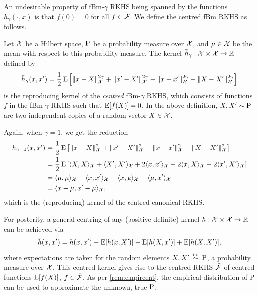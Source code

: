 An undesirable property of fBm-$\gamma$ RKHS being spanned by the functions $h_\gamma(\cdot,x)$ is that $f(0)=0$ for all $f \in {\mathcal F}$.
We define the centred fBm RKHS as follows.

\begin{definition}
  Let ${\mathcal X}$ be a Hilbert space, $\operatorname{P}$ be a probability measure over ${\mathcal X}$, and $\mu\in{\mathcal X}$ be the mean 
  with respect to this probability measure.
  The kernel $\bar h_\gamma:{\mathcal X}\times{\mathcal X}\to\mathbb{R}$ defined by
  \[
    \bar h_\gamma(x,x') = \frac{1}{2} \operatorname{E} \left[ \lVert x-X\rVert_{\mathcal X}^{2\gamma} + \lVert x'-X'\rVert_{\mathcal X}^{2\gamma} - \lVert x-x'\rVert_{\mathcal X}^{2\gamma} - \lVert X-X'\rVert_{\mathcal X}^{2\gamma} \right]
  \]
  is the reproducing kernel of the \emph{centred} fBm-$\gamma$ RKHS, which consists of functions $f$ in the fBm-$\gamma$ RKHS such that $\operatorname{E} [f(X)] = 0$.
  In the above definition, $X,X' \sim \operatorname{P}$ are two independent copies of a random vector $X \in {\mathcal X}$.
\end{definition}

\begin{remark}
  Again, when $\gamma=1$, we get the reduction 
  \vspace{-0.1em}
  \begin{align*}
    \bar h_{\gamma=1}(x,x') 
    &= \half \E \left[ \norm{x-X}_\cX^{2} + \norm{x'-X'}_\cX^{2} - \norm{x-x'}_\cX^{2} - \norm{X-X'}_\cX^{2} \right] \\
    &= \half \E \left[ \ip{X,X}_\cX + \ip{X',X'}_\cX + 2\ip{x,x'}_\cX - 2\ip{x,X}_\cX - 2\ip{x',X'}_\cX\right] \\
    &= \ip{\mu,\mu}_\cX + \ip{x,x'}_\cX - \ip{x,\mu}_\cX - \ip{\mu,x'}_\cX \\
    &= \ip{x-\mu,x'-\mu}_\cX, \vspace{-1em}
  \end{align*}
  which is the (reproducing) kernel of the centred canonical RKHS.
\end{remark}

\begin{remark}
  For posterity, a general centring of any (positive-definite) kernel $h:{\mathcal X}\times{\mathcal X}\to\mathbb{R}$ can be achieved via
  \[
    \bar h(x,x') = h(x,x') - \operatorname{E}[h(x,X')] - \operatorname{E}[h(X,x')] + \operatorname{E}[h(X,X')],
  \]  
  where expectations are taken for the random elements $X,X'\,\overset{\text{iid}}{\sim}\,\operatorname{P}$, a probability measure over ${\mathcal X}$.
  This centred kernel gives rise to the centred RKHS $\bar{{\mathcal F}}$ of centred functions $\operatorname{E}[f(X)]$, $f\in\bar{{\mathcal F}}$.
  As per \cref{rem:empircent}, the empirical distribution of $\operatorname{P}$ can be used to approximate the unknown, true $\operatorname{P}$.
\end{remark}

